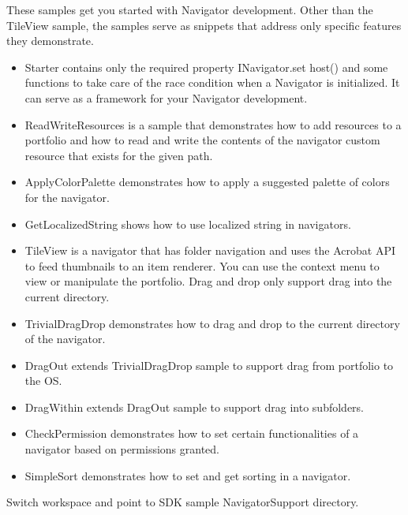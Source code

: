 \documentclass[letterpaper,12pt,english,openany,oneside]{sphinxmanual}
\begin{document}
These samples get you started with Navigator development. Other than the TileView sample, the samples serve as snippets that address only specific features they demonstrate.
\begin{itemize}
\item {} 
Starter contains only the required property INavigator.set host() and some functions to take care of the race condition when a Navigator is initialized. It can serve as a framework for your Navigator development.

\item {} 
ReadWriteResources is a sample that demonstrates how to add resources to a portfolio and how to read and write the contents of the navigator custom resource that exists for the given path.

\item {} 
ApplyColorPalette demonstrates how to apply a suggested palette of colors for the navigator.

\item {} 
GetLocalizedString shows how to use localized string in navigators.

\item {} 
TileView is a navigator that has folder navigation and uses the Acrobat API to feed thumbnails to an item renderer. You can use the context menu to view or manipulate the portfolio. Drag and drop only support drag into the current directory.

\item {} 
TrivialDragDrop demonstrates how to drag and drop to the current directory of the navigator.

\item {} 
DragOut extends TrivialDragDrop sample to support drag from portfolio to the OS.

\item {} 
DragWithin extends DragOut sample to support drag into sub\sphinxhyphen{}folders.

\item {} 
CheckPermission demonstrates how to set certain functionalities of a navigator based on permissions granted.

\item {} 
SimpleSort demonstrates how to set and get sorting in a navigator.

\end{itemize}


Switch workspace and point to SDK sample NavigatorSupport directory.
\end{document}
